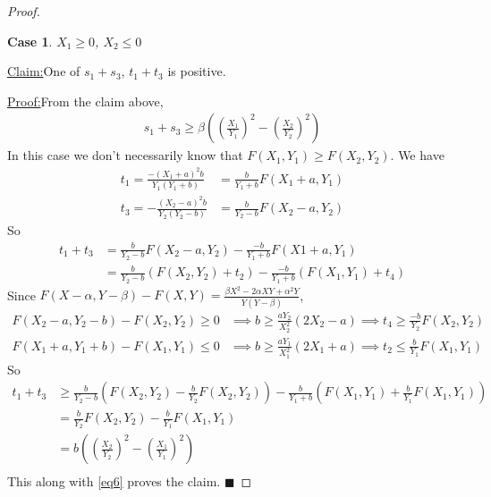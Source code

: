 \documentclass{article}
\theoremstyle{case}
\newtheorem{case}{Case}
\newenvironment{claim}[1]{\par\noindent\underline{Claim:}\space#1}{}
\newenvironment{claimproof}[1]{\par\noindent\underline{Proof:}\space#1}{\hfill $\blacksquare$}
\begin{document}
\begin{proof}
\begin{case}
$X_1 \geq 0$, $X_2 \leq 0$
\end{case}
\begin{claim}
One of $s_1 + s_3$,  $t_1 + t_3$ is positive.
\end{claim}
\begin{claimproof}
From the claim above, 
\begin{align} \label{eq6}
s_1 + s_3 \geq \beta \left( \left( \frac{X_1}{Y_1}\right)^2 - \left( \frac{X_2}{Y_2}\right)^2 \right)
\end{align}
In this case we don't necessarily know that $F(X_1, Y_1) \geq F(X_2, Y_2)$. We have
\begin{align*}
t_1 = \frac{-\left( X_1 + a \right)^2b }{Y_1\left( Y_1 + b\right)} & = \frac{b}{Y_1+b}F(X_1+a, Y_1) \\
t_3 = -\frac{\left( X_2 - a \right)^2 b }{Y_2\left( Y_2-b\right) } & = \frac{b}{Y_2 -b}F(X_2-a, Y_2)
\end{align*}
So
\begin{align*}
t_1 + t_3 & = \frac{b}{Y_2-b}F(X_2 - a,Y_2) - \frac{-b}{Y_1 + b}F(X1 + a, Y_1) \\
& = \frac{b}{Y_2-b}\left( F(X_2, Y_2) + t_2\right) - \frac{-b}{Y_1 + b}\left( F(X_1, Y_1) + t_4\right)
\end{align*}
Since $F(X - \alpha, Y - \beta) - F(X, Y) = \frac{\beta X^2 - 2\alpha XY + \alpha^2 Y}{Y\left( Y-\beta\right)}$, 
\begin{align*}
F(X_2 - a, Y_2 - b) - F(X_2, Y_2) \geq 0 & \implies b \geq \frac{a Y_2}{X_2^2}\left( 2X_2 - a \right) \implies t_4 \geq \frac{-b}{Y_2}F(X_2, Y_2) \\
F(X_1+a, Y_1+b) - F(X_1, Y_1) \leq 0 & \implies b \geq \frac{aY_1}{X_1^2}\left( 2X_1 + a \right) \implies t_2 \leq \frac{b}{Y_1}F(X_1, Y_1)
\end{align*}
So 
\begin{align*}
t_1 + t_3 & \geq \frac{b}{Y_2 - b}\left( F(X_2, Y_2) - \frac{b}{Y_2}F(X_2, Y_2)\right) - \frac{b}{Y_1+b}\left( F(X_1, Y_1) + \frac{b}{Y_1}F(X_1, Y_1)\right) \\
& = \frac{b}{Y_2}F(X_2, Y_2) - \frac{b}{Y_1}F(X_1, Y_1) \\
& = b \left( \left( \frac{X_2}{Y_2}\right)^2 - \left( \frac{X_1}{Y_1}\right)^2 \right) \\
\end{align*}
This along with \ref{eq6} proves the claim.
\end{claimproof}


\end{proof}
\end{document}

